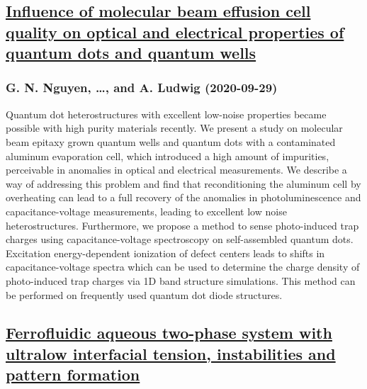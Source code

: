\subsection*{\href{http://arxiv.org/abs/2009.13966v1}{Influence of molecular beam effusion cell quality on optical and  electrical properties of quantum dots and quantum wells}}
\subsubsection*{G. N. Nguyen, \dots, and A. Ludwig (2020-09-29)}
Quantum dot heterostructures with excellent low-noise properties became
possible with high purity materials recently. We present a study on molecular
beam epitaxy grown quantum wells and quantum dots with a contaminated aluminum
evaporation cell, which introduced a high amount of impurities, perceivable in
anomalies in optical and electrical measurements. We describe a way of
addressing this problem and find that reconditioning the aluminum cell by
overheating can lead to a full recovery of the anomalies in photoluminescence
and capacitance-voltage measurements, leading to excellent low noise
heterostructures. Furthermore, we propose a method to sense photo-induced trap
charges using capacitance-voltage spectroscopy on self-assembled quantum dots.
Excitation energy-dependent ionization of defect centers leads to shifts in
capacitance-voltage spectra which can be used to determine the charge density
of photo-induced trap charges via 1D band structure simulations. This method
can be performed on frequently used quantum dot diode structures.

\subsection*{\href{http://arxiv.org/abs/2009.13945v1}{Ferrofluidic aqueous two-phase system with ultralow interfacial tension,  instabilities and pattern formation}}
